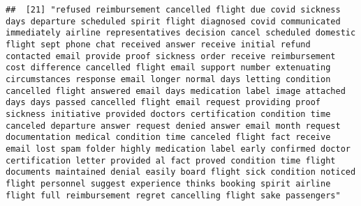 \documentclass[
]{article}
\begin{document}
\begin{verbatim}
##  [21] "refused reimbursement cancelled flight due covid sickness days departure scheduled spirit flight diagnosed covid communicated immediately airline representatives decision cancel scheduled domestic flight sept phone chat received answer receive initial refund contacted email provide proof sickness order receive reimbursement cost difference cancelled flight email support number extenuating circumstances response email longer normal days letting condition cancelled flight answered email days medication label image attached days days passed cancelled flight email request providing proof sickness initiative provided doctors certification condition time canceled departure answer request denied answer email month request documentation medical condition time canceled flight fact receive email lost spam folder highly medication label early confirmed doctor certification letter provided al fact proved condition time flight documents maintained denial easily board flight sick condition noticed flight personnel suggest experience thinks booking spirit airline flight full reimbursement regret cancelling flight sake passengers"                                                                                                                                                                                                                                                                                                                                                                                                                                                                                                                                                                                                                   

\end{verbatim}
\end{document}
